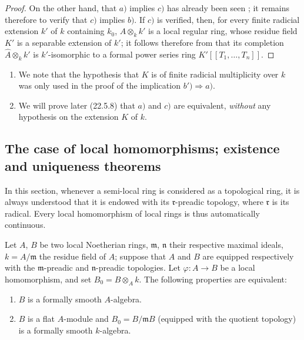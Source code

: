 \begin{proof}
On the other hand, that $a)$ implies $c)$ has already been seen ;
it remains therefore to verify that $c)$ implies $b)$.
If $c)$ is verified, then, for every finite radicial extension $k'$ of $k$ containing $k_0$, $A\otimes_k k'$ is a local regular ring, whose residue field $K'$ is a separable extension of $k'$;
it follows therefore from  that its completion $\widehat{A}\otimes_k k'$ is $k'$-isomorphic to a formal power series ring $K'[[T_1,\ldots,T_n]]$.
\end{proof}

\begin{remarks}[19.6.7]
\label{0.19.6.7}
\begin{enumerate}
  \item[\rm(i)] We note that the hypothesis that $K$ is of finite radicial multiplicity over $k$ was only used in the proof of the implication $b')\Rightarrow a)$.
  \item[\rm(ii)] We will prove later (22.5.8) that $a)$ and $c)$ are equivalent, \emph{without} any hypothesis on the extension $K$ of $k$.
\end{enumerate}
\end{remarks}

\subsection{The case of local homomorphisms; existence and uniqueness theorems}
\label{subsection:0.19.7}

In this section, whenever a semi-local ring is considered as a topological ring, it is always understood that it is endowed with its $\mathfrak{r}$-preadic topology, where $\mathfrak{r}$ is its radical. Every local homomorphism of local rings is thus automatically continuous.

\begin{theorem}[19.7.1]
\label{0.19.7.1}
Let $A$, $B$ be two local Noetherian rings, $\mathfrak{m}$, $\mathfrak{n}$ their respective maximal ideals, $k=A/\mathfrak{m}$ the residue field of $A$; suppose that $A$ and $B$ are equipped respectively with the $\mathfrak{m}$-preadic and $\mathfrak{n}$-preadic topologies.
Let $\varphi:A\to B$ be a local homomorphism, and set $B_0=B\otimes_A k$.
The following properties are equivalent:
\begin{enumerate}
  \item[\rm a)] $B$ is a formally smooth $A$-algebra.
  \item[\rm b)] $B$ is a flat $A$-module and $B_0=B/\mathfrak{m}B$ (equipped with the quotient topology) is a formally smooth $k$-algebra.
\end{enumerate}
\end{theorem}

